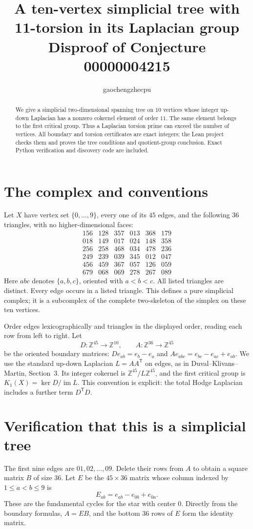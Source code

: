\documentclass[11pt]{article}
\title{A ten-vertex simplicial tree with\\11-torsion in its Laplacian group\\
\large Disproof of Conjecture 00000004215}
\author{gaochengzhecpu}\date{}
\newcommand{\Z}{\mathbb Z}\newcommand{\Q}{\mathbb Q}
\begin{document}
\maketitle
\begin{abstract}
We give a simplicial two-dimensional spanning tree on $10$ vertices
whose integer up-down Laplacian has a nonzero cokernel element of
order $11$. The same element belongs to the first critical group.
Thus a Laplacian torsion prime can exceed the number of vertices.
All boundary and torsion certificates are exact integers; the Lean
project checks them and proves the tree conditions and quotient-group
conclusion. Exact Python verification and discovery code are included.
\end{abstract}

\section*{The complex and conventions}
Let $X$ have vertex set $\{0,\ldots,9\}$, every one of its $45$ edges,
and the following $36$ triangles, with no higher-dimensional faces:
\[
\begin{array}{rrrrrr}
156&128&357&013&368&179\\
018&149&017&024&148&358\\
256&258&468&034&478&236\\
249&239&039&345&012&047\\
456&459&367&057&126&059\\
679&068&069&278&267&089
\end{array}
\]
Here $abc$ denotes $\{a,b,c\}$, oriented with $a<b<c$.
All listed triangles are distinct. Every edge occurs in a listed
triangle. This defines a pure simplicial complex; it is a subcomplex
of the complete two-skeleton of the simplex on these ten vertices.

Order edges lexicographically and triangles in the displayed order,
reading each row from left to right. Let
\[
 D:\Z^{45}\longrightarrow\Z^{10},\qquad
 A:\Z^{36}\longrightarrow\Z^{45}
\]
be the oriented boundary matrices:
$D e_{ab}=e_b-e_a$ and
$A e_{abc}=e_{bc}-e_{ac}+e_{ab}$.
We use the standard up-down Laplacian $L=AA^{\mathsf T}$ on edges,
as in Duval--Klivans--Martin, Section~3. Its integer cokernel is
$\Z^{45}/L\Z^{45}$, and the first critical group is
$K_1(X)=\ker D/\operatorname{im}L$. This convention is explicit:
the total Hodge Laplacian includes a further term $D^{\mathsf T}D$.

\newpage
\section*{Verification that this is a simplicial tree}
The first nine edges are $01,02,\ldots,09$. Delete their rows from
$A$ to obtain a square matrix $B$ of size $36$. Let $E$ be the
$45\times36$ matrix whose column indexed by $1\le a<b\le9$ is
\[
 E_{ab}=e_{ab}-e_{0b}+e_{0a}.
\]
These are the fundamental cycles for the star with center $0$.
Directly from the boundary formulas, $A=EB$, and the bottom
$36$ rows of $E$ form the identity matrix.
\end{document}
